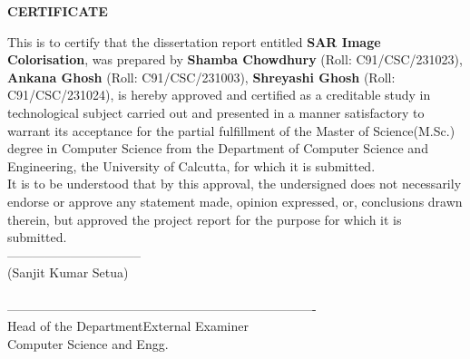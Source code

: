 \begin{center}
    {\large {\bf CERTIFICATE}}
\end{center}

This is to certify that the dissertation report entitled \textbf{SAR Image Colorisation}, was prepared by \textbf{Shamba Chowdhury} (Roll: C91/CSC/231023), \textbf{Ankana Ghosh} (Roll: C91/CSC/231003), \textbf{Shreyashi Ghosh} (Roll: C91/CSC/231024), is hereby approved and certified as a creditable study in technological subject carried out and presented in a manner satisfactory to warrant its acceptance for the partial fulfillment of the Master of Science(M.Sc.) degree in Computer Science from the Department of Computer Science and Engineering, the University of Calcutta, for which it is submitted. \\
It is to be understood that by this approval, the undersigned does not necessarily endorse or approve any statement made, opinion expressed, or, conclusions drawn therein, but approved the project report for the purpose for which it is submitted.
\\[.5cm]

\large{--------------------------------}\\
\hspace*{.4in}\large{(Sanjit Kumar Setua)}\\
\hspace*{.5in}\\[1.0cm]

\large{---------------------------------------}\hspace*{1.5in}\large{----------------------------------}\\
\hspace*{.4in}\large{Head of the Department}\hspace*{2.2in}\large{External Examiner}
\\[0.1cm]
\hspace*{.2in}Computer Science and Engg.
